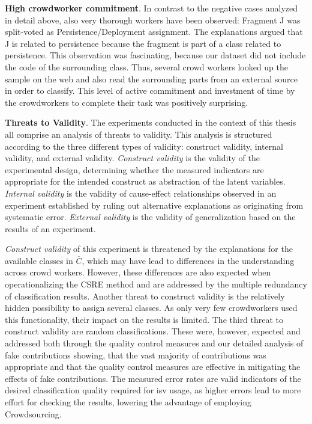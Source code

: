 \textbf{High crowdworker commitment}. In contrast to the negative cases analyzed in detail above, also very thorough workers have been observed: Fragment J was split-voted as Persistence/Deployment assignment.
The explanations argued that J is related to persistence because the fragment is part of a class related to persistence.
This observation was
fascinating, because our dataset did not include the code of the surrounding class.
Thus, several crowd workers looked up the sample on the \gls{web} and also read the surrounding parts from an external source in order to classify.
This level of active commitment and investment of time by the crowdworkers
to complete their task was positively surprising.

\textbf{Threats to Validity}. The experiments conducted in the context of this thesis all comprise an analysis of threats to validity.
This analysis is structured according to the three different types of validity: construct validity, internal validity, and external validity.
\emph{Construct validity} is the validity of the experimental design, determining whether the measured indicators are appropriate for the intended construct as abstraction of the latent variables.
\emph{Internal validity} is the validity of cause-effect relationships observed in an experiment established by ruling out alternative explanations as originating from systematic error.
\emph{External validity} is the validity of generalization based on the results of an experiment.
\autocite{Creswell2014ResearchDesign}

\emph{Construct validity} of this experiment is threatened by the explanations for the available classes in \(\overline C\), which may have lead to differences in the understanding across crowd workers.
However, these differences are also expected when operationalizing the CSRE method and are addressed by the multiple redundancy of classification results.
Another threat to construct validity is the relatively hidden possibility to assign several classes.
As only very few crowdworkers used this functionality, their impact on the results is limited.
The third threat to construct validity are random classifications.
These were, however, expected and addressed both through the quality control measures and our detailed analysis of fake contributions showing, that the vast majority of contributions was appropriate and that the quality control measures are effective in mitigating the effects of fake contributions.
The measured error rates are valid indicators of the desired classification quality required for \gls{isv} usage, as higher errors lead to more effort for checking the results, lowering the advantage of employing \gls{Crowdsourcing}.

